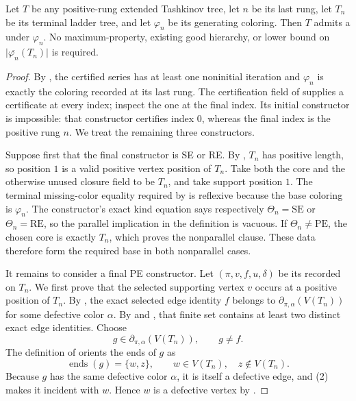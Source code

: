 \begin{lemma}
Let $T$ be any positive-rung extended Tashkinov tree, let $n$ be its last
rung, let $T_n$ be its terminal ladder tree, and let $\varphi_n$ be its
generating coloring.  Then $T$ admits a
 under $\varphi_n$.  No maximum-property, existing
good hierarchy, or lower bound on $\lvert\overline{\varphi_n}(T_n)\rvert$
is required.
\end{lemma}
\begin{proof}
By , the certified series has at least one
noninitial iteration and $\varphi_n$ is exactly the coloring recorded at
its last rung.  The certification field of 
supplies a  certificate at every index; inspect
the one at the final index.  Its initial constructor is impossible:
that constructor certifies index $0$, whereas the final index is the
positive rung $n$.  We treat the remaining three constructors.

Suppose first that the final constructor is SE or RE.  By
, $T_n$ has positive length, so position $1$ is a
valid positive vertex position of $T_n$.  Take both the core and the
otherwise unused closure field to be $T_n$, and take support position $1$.
The terminal missing-color equality required by 
is reflexive because the base coloring is $\varphi_n$.  The constructor's
exact kind equation says respectively $\Theta_n=\mathrm{SE}$ or
$\Theta_n=\mathrm{RE}$, so the parallel implication in the definition is
vacuous.  If $\Theta_n\ne\mathrm{PE}$, the chosen core is exactly $T_n$,
which proves the nonparallel clause.  These data therefore form the
required base in both nonparallel cases.

It remains to consider a final PE constructor.  Let
$(\pi,v,f,u,\delta)$ be its recorded
 on $T_n$.  We first prove that the
selected supporting vertex $v$ occurs at a positive position of $T_n$.
By , the exact selected edge identity $f$ belongs
to $\partial_{\pi,\alpha}(V(T_n))$ for some defective color $\alpha$.
By  and , that finite
set contains at least two distinct exact edge identities.  Choose
\[
              g\in\partial_{\pi,\alpha}(V(T_n)),\qquad g\ne f.  \tag{1}
\]
The definition of  orients the ends of $g$ as
\[
       \operatorname{ends}(g)=\{w,z\},\qquad
       w\in V(T_n),\quad z\notin V(T_n).                         \tag{2}
\]
Because $g$ has the same defective color $\alpha$, it is itself a
defective edge, and (2) makes it incident with $w$.  Hence $w$ is a
defective vertex by .


\end{proof}
